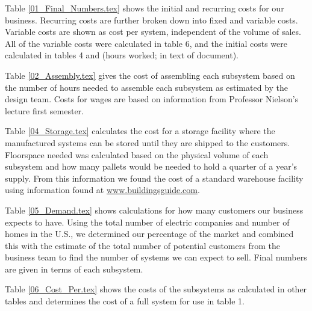 

Table \ref{01_Final_Numbers.tex} shows the initial and recurring costs for our business. Recurring costs are further broken down into fixed and variable costs. Variable costs are shown as cost per system, independent of the volume of sales. All of the variable costs were calculated in table 6, and the initial costs were calculated in tables 4 and (hours worked; in text of document). 



Table \ref{02_Assembly.tex} gives the cost of assembling each subsystem based on the number of hours needed to assemble each subsystem as estimated by the design team. Costs for wages are based on information from Professor Nielson's lecture first semester.



Table \ref{04_Storage.tex} calculates the cost for a storage facility where the manufactured systems can be stored until they are shipped to the customers. Floorspace needed was calculated based on the physical volume of each subsystem and how many pallets would be needed to hold a quarter of a year's supply. From this information we found the cost of a standard warehouse facility using information found at \url{www.buildingsguide.com}.



Table \ref{05_Demand.tex} shows calculations for how many customers our business expects to have. Using the total number of electric companies and number of homes in the U.S., we determined our percentage of the market and combined this with the estimate of the total number of potential customers from the business team to find the number of systems we can expect to sell. Final numbers are given in terms of each subsystem.



Table \ref{06_Cost_Per.tex} shows the costs of the subsystems as calculated in other tables and determines the cost of a full system for use in table 1. 


